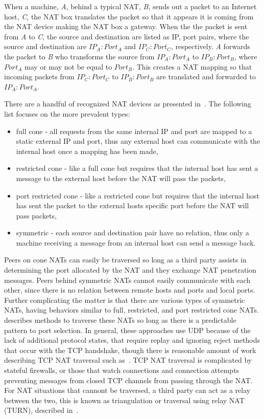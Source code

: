 When a machine, \textit{A}, behind a typical NAT, \textit{B}, sends out a
packet to an Internet host, \textit{C}, the NAT box translates the packet so
that it appears it is coming from the NAT device making the NAT box a gateway.
When the the packet is sent from \textit{A} to \textit{C}, the source and
destination are listed as IP, port pairs, where the source and destination are
$IP_A:Port_A$ and $IP_C:Port_C$, respectively.  \textit{A} forwards the packet
to \textit{B} who transforms the source from $IP_A:Port_A$ to $IP_B:Port_B$,
where $Port_A$ may or may not be equal to $Port_B$.  This creates a NAT mapping
so that incoming packets from $IP_C:Port_C$ to $IP_B:Port_B$ are translated and
forwarded to $IP_A:Port_A$.

There are a handful of recognized NAT devices as presented in~\cite{stun,
p2p_nats_rfc}.  The following list focuses on the more prevalent types:
\begin{itemize}
\item full cone - all requests from the same internal IP and port are mapped to
a static external IP and port, thus any external host can communicate with the
internal host once a mapping has been made,
\item restricted cone - like a full cone but requires that the internal host
has sent a message to the external host before the NAT will pass the packets,
\item port restricted cone - like a restricted cone but requires that the
internal host has sent the packet to the external hosts specific port before the
NAT will pass packets,
\item symmetric - each source and destination pair have no relation, thus only
a machine receiving a message from an internal host can send a message back.
\end{itemize}

Peers on cone NATs can easily be traversed so long as a third party assists in
determining the port allocated by the NAT and they exchange NAT penetration
messages.  Peers behind symmetric NATs cannot easily communicate with each
other, since there is no relation between remote hosts and ports and local
ports.  Further complicating the matter is that there are various types of
symmetric NATs, having behaviors similar to full, restricted, and port
restricted cone NATs.  \cite{nat_stun} describes methods to traverse these
NATs so long as there is a predictable pattern to port selection.  In general,
these approaches use UDP because of the lack of additional protocol states,
that require replay and ignoring reject methods that occur with the TCP
handshake,  though there is reasonable amount of work describing TCP NAT
traversal such as~\cite{tcp_nat}.  TCP NAT traversal is complicated by stateful
firewalls, or those that watch connections and connection attempts preventing
messages from closed TCP channels from passing through the NAT.  For NAT
situations that cannont be traversed, a third party can act as a relay between
the two, this is known as triangulation or traversal using relay NAT (TURN),
described in~\cite{turn}.

